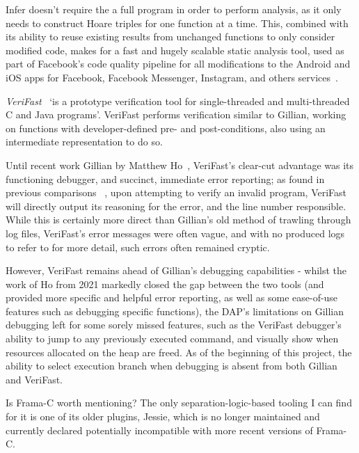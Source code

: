 Infer doesn't require the a full program in order to perform analysis, as it
only needs to construct Hoare triples for one function at a time. This,
combined with its ability to reuse existing results from unchanged functions to
only consider modified code, makes for a fast and hugely scalable static
analysis tool, used as part of Facebook's code quality pipeline for all
modifications to the Android and iOS apps for Facebook, Facebook Messenger,
Instagram, and others services~\cite{infer-about}.


\textit{VeriFast}~\cite{verifast-paper, verifast-repo} `is a prototype
verification tool for single-threaded and multi-threaded C and Java programs'.
VeriFast performs verification similar to Gillian, working on functions with
developer-defined pre- and post-conditions, also using an intermediate
representation to do so.

Until recent work Gillian by Matthew Ho~\cite{gillian-debugging-2021},
VeriFast's clear-cut advantage was its functioning debugger, and succinct,
immediate error reporting; as found in previous comparisons
~\cite{gillian-logging-2020}, upon attempting to verify an invalid program,
VeriFast will directly output its reasoning for the error, and the line number
responsible. While this is certainly more direct than Gillian's old method of
trawling through log files, VeriFast's error messages were often vague, and
with no produced logs to refer to for more detail, such errors often remained
cryptic.

However, VeriFast remains ahead of Gillian's debugging capabilities - whilst
the work of Ho from 2021 markedly closed the gap between the two tools (and
provided more specific and helpful error reporting, as well as some ease-of-use
features such as debugging specific functions), the DAP's limitations on
Gillian debugging left for some sorely missed features, such as the VeriFast
debugger's ability to jump to any previously executed command, and visually
show when resources allocated on the heap are freed. As of the beginning of
this project, the ability to select execution branch when debugging is absent
from both Gillian and VeriFast.

Is Frama-C worth mentioning? The only separation-logic-based tooling I can
find for it is one of its older plugins, Jessie, which is no longer maintained
and currently declared potentially incompatible with more recent versions of
Frama-C.


